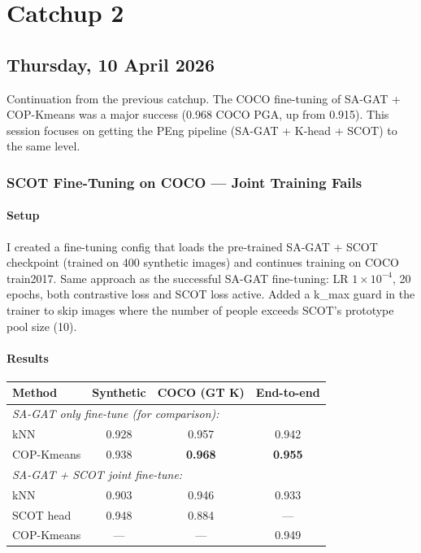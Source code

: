 \chapter[Catchup 2]{Catchup 2}

\section[2026/04/10]{Thursday, 10 April 2026}

Continuation from the previous catchup. The COCO fine-tuning of SA-GAT + COP-Kmeans was a major success (0.968 COCO PGA, up from 0.915). This session focuses on getting the PEng pipeline (SA-GAT + K-head + SCOT) to the same level.


\subsection{SCOT Fine-Tuning on COCO --- Joint Training Fails}

\subsubsection{Setup}

I created a fine-tuning config that loads the pre-trained SA-GAT + SCOT checkpoint (trained on 400 synthetic images) and continues training on COCO train2017. Same approach as the successful SA-GAT fine-tuning: LR $1 \times 10^{-4}$, 20 epochs, both contrastive loss and SCOT loss active. Added a k\_max guard in the trainer to skip images where the number of people exceeds SCOT's prototype pool size (10).

\subsubsection{Results}

\begin{tabular}{lccc}
\hline
\textbf{Method} & \textbf{Synthetic} & \textbf{COCO (GT K)} & \textbf{End-to-end} \\
\hline
\multicolumn{4}{l}{\emph{SA-GAT only fine-tune (for comparison):}} \\
kNN & 0.928 & 0.957 & 0.942 \\
COP-Kmeans & 0.938 & \textbf{0.968} & \textbf{0.955} \\
\hline
\multicolumn{4}{l}{\emph{SA-GAT + SCOT joint fine-tune:}} \\
kNN & 0.903 & 0.946 & 0.933 \\
SCOT head & 0.948 & 0.884 & --- \\
COP-Kmeans & --- & --- & 0.949 \\
\hline
\end{tabular}

